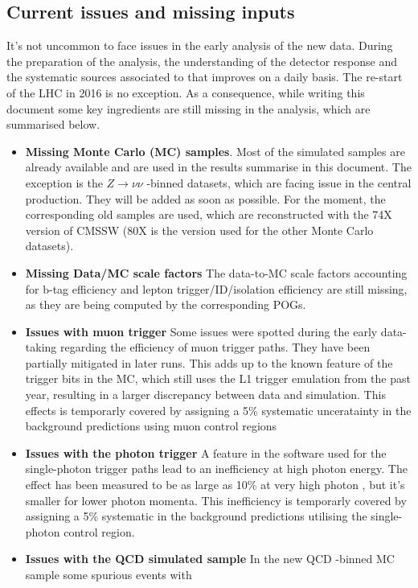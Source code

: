 \subsection{Current issues and missing inputs\label{sec:disclaimers}}
It's not uncommon to face issues in the early analysis of the new data. 
During the preparation of the analysis, the understanding of the detector response and 
the systematic sources associated to that improves on a daily basis. 
The re-start of the LHC in 2016 is no exception. 
As a consequence, while writing this document some key ingredients are still missing in the analysis, 
which are summarised below.
\begin{itemize}
\item \textbf{Missing Monte Carlo (MC) samples}. Most of the simulated samples are already available and are used in the results summarise in this document. 
The exception is the $Z\rightarrow\nu\nu$ \scalht-binned datasets, which are facing issue in the central production. They will be added as soon as possible. 
For the moment, the corresponding old samples are used, which are reconstructed with the 74X version of CMSSW (80X is the version used for the other Monte Carlo datasets). 
\item \textbf{Missing Data/MC scale factors} The data-to-MC scale factors accounting for b-tag efficiency and lepton trigger/ID/isolation efficiency are 
still missing, as they are being computed by the corresponding POGs. 
\item \textbf{Issues with muon trigger} Some issues were spotted during the early data-taking regarding the efficiency of muon trigger paths. 
They have been partially mitigated in later runs. This adds up to the known feature of the trigger bits in the MC, which still uses the L1 trigger emulation from the past year, resulting 
in a larger discrepancy between data and simulation. This effects is temporarly covered by assigning a 5\% systematic unceratainty in the background predictions 
using muon control regions
\item \textbf{Issues with the photon trigger} A feature in the software used for the single-photon trigger paths lead to an inefficiency at 
high photon energy. The effect has been measured to be as large as 10\% at very high photon \pt, but it's smaller for lower photon momenta. 
This inefficiency is temporarly covered by assigning a 5\% systematic in the background predictions utilising the single-photon control region.
\item \textbf{Issues with the QCD simulated sample} In the new QCD \scalht-binned MC sample some spurious events with 

\end{itemize}
